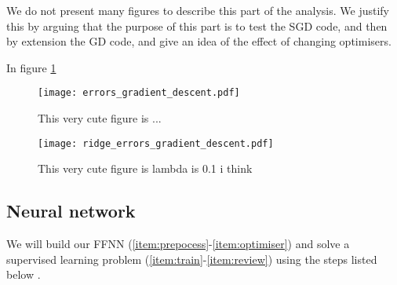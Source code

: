     We do not present many figures to describe this part of the analysis. We justify this by arguing that the purpose of this part is to test the SGD code, and then by extension the GD code, and give an idea of the effect of changing optimisers. 

    In figure \ref{fig:simple_reg_errors_ols}  \fillertext

    \begin{figure}
        \texttt{[image: errors\_gradient\_descent.pdf]}
        \caption{This very cute figure is ...}
        \label{fig:simple_reg_errors_ols}
    \end{figure}

    \begin{figure}
        \texttt{[image: ridge\_errors\_gradient\_descent.pdf]}
        \caption{This very cute figure is  lambda is 0.1 i think}
        \label{fig:simple_reg_errors_ridge}
    \end{figure}




    
\subsection{Neural network}
    We will build our FFNN (\ref{item:prepocess}-\ref{item:optimiser}) and solve a supervised learning problem (\ref{item:train}-\ref{item:review}) using the steps listed below \citep{mhjensen}.

